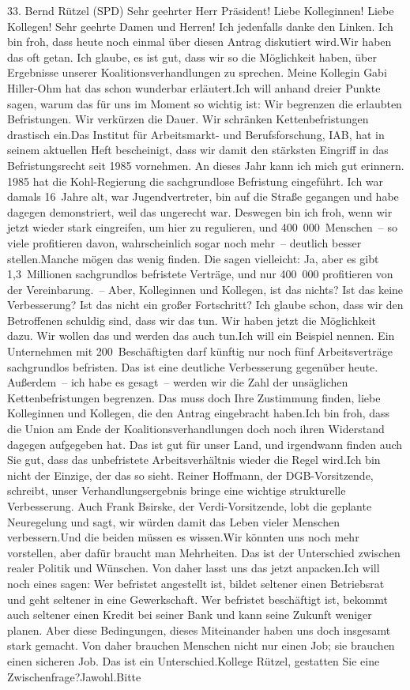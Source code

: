 \documentclass{article}
\begin{document}
	33. Bernd Rützel (SPD) Sehr geehrter Herr Präsident! Liebe Kolleginnen! Liebe Kollegen! Sehr geehrte Damen und Herren! Ich jedenfalls danke den Linken. Ich bin froh, dass heute noch einmal über diesen Antrag diskutiert wird.Wir haben das oft getan. Ich glaube, es ist gut, dass wir so die Möglichkeit haben, über Ergebnisse unserer Koalitionsverhandlungen zu sprechen. Meine Kollegin Gabi Hiller-Ohm hat das schon wunderbar erläutert.Ich will anhand dreier Punkte sagen, warum das für uns im Moment so wichtig ist: Wir begrenzen die erlaubten Befristungen. Wir verkürzen die Dauer. Wir schränken Kettenbefristungen drastisch ein.Das Institut für Arbeitsmarkt- und Berufsforschung, IAB, hat in seinem aktuellen Heft bescheinigt, dass wir damit den stärksten Eingriff in das Befristungsrecht seit 1985 vornehmen. An dieses Jahr kann ich mich gut erinnern. 1985 hat die Kohl-Regierung die sachgrundlose Befristung eingeführt. Ich war damals 16 Jahre alt, war Jugendvertreter, bin auf die Straße gegangen und habe dagegen demonstriert, weil das ungerecht war. Deswegen bin ich froh, wenn wir jetzt wieder stark eingreifen, um hier zu regulieren, und 400 000 Menschen – so viele profitieren davon, wahrscheinlich sogar noch mehr – deutlich besser stellen.Manche mögen das wenig finden. Die sagen vielleicht: Ja, aber es gibt 1,3 Millionen sachgrundlos befristete Verträge, und nur 400 000 profitieren von der Vereinbarung. – Aber, Kolleginnen und Kollegen, ist das nichts? Ist das keine Verbesserung? Ist das nicht ein großer Fortschritt? Ich glaube schon, dass wir den Betroffenen schuldig sind, dass wir das tun. Wir haben jetzt die Möglichkeit dazu. Wir wollen das und werden das auch tun.Ich will ein Beispiel nennen. Ein Unternehmen mit 200 Beschäftigten darf künftig nur noch fünf Arbeitsverträge sachgrundlos befristen. Das ist eine deutliche Verbesserung gegenüber heute. Außerdem – ich habe es gesagt – werden wir die Zahl der unsäglichen Kettenbefristungen begrenzen. Das muss doch Ihre Zustimmung finden, liebe Kolleginnen und Kollegen, die den Antrag eingebracht haben.Ich bin froh, dass die Union am Ende der Koalitionsverhandlungen doch noch ihren Widerstand dagegen aufgegeben hat. Das ist gut für unser Land, und irgendwann finden auch Sie gut, dass das unbefristete Arbeitsverhältnis wieder die Regel wird.Ich bin nicht der Einzige, der das so sieht. Reiner Hoffmann, der DGB-Vorsitzende, schreibt, unser Verhandlungsergebnis bringe eine wichtige strukturelle Verbesserung. Auch Frank Bsirske, der Verdi-Vorsitzende, lobt die geplante Neuregelung und sagt, wir würden damit das Leben vieler Menschen verbessern.Und die beiden müssen es wissen.Wir könnten uns noch mehr vorstellen, aber dafür braucht man Mehrheiten. Das ist der Unterschied zwischen realer Politik und Wünschen. Von daher lasst uns das jetzt anpacken.Ich will noch eines sagen: Wer befristet angestellt ist, bildet seltener einen Betriebsrat und geht seltener in eine Gewerkschaft. Wer befristet beschäftigt ist, bekommt auch seltener einen Kredit bei seiner Bank und kann seine Zukunft weniger planen. Aber diese Bedingungen, dieses Miteinander haben uns doch insgesamt stark gemacht. Von daher brauchen Menschen nicht nur einen Job; sie brauchen einen sicheren Job. Das ist ein Unterschied.Kollege Rützel, gestatten Sie eine Zwischenfrage?Jawohl.Bitte 
\end{document}
